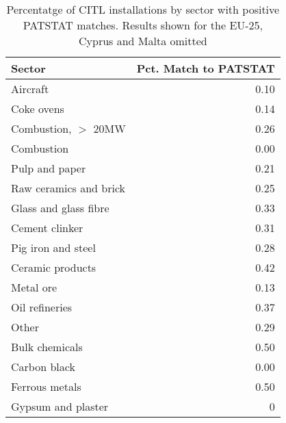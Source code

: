 \begin{table}[ht]
\centering
\begin{tabular}{lr}
  \hline
Sector & Pct. Match to PATSTAT \\ 
  \hline
Aircraft & 0.10 \\ 
  Coke ovens & 0.14 \\ 
  Combustion, $>$ 20MW & 0.26 \\ 
  Combustion & 0.00 \\ 
  Pulp and paper & 0.21 \\ 
  Raw ceramics and brick & 0.25 \\ 
  Glass and glass fibre & 0.33 \\ 
  Cement clinker & 0.31 \\ 
  Pig iron and steel & 0.28 \\ 
  Ceramic products & 0.42 \\ 
  Metal ore & 0.13 \\ 
  Oil refineries & 0.37 \\ 
  Other & 0.29 \\ 
  Bulk chemicals & 0.50 \\ 
  Carbon black & 0.00 \\ 
  Ferrous metals & 0.50 \\ 
  Gypsum and plaster & 0 \\ 
   \hline
\end{tabular}
\caption{Percentatge of CITL installations by sector with positive PATSTAT matches. Results shown for the EU-25, Cyprus and Malta omitted} 
\label{tab:pct-match-bytype}
\end{table}
